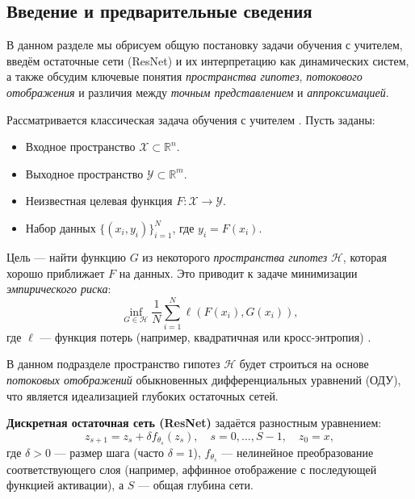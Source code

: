 \documentclass[../NDCNNAI_main.tex]{subfiles}
\begin{document}
\subsection{Введение и предварительные сведения}

В данном разделе мы обрисуем общую постановку задачи обучения с учителем, введём остаточные сети (ResNet) и их интерпретацию как динамических систем, а также обсудим ключевые понятия \emph{пространства гипотез}, \emph{потокового отображения} и различия между \emph{точным представлением} и \emph{аппроксимацией}.

Рассматривается классическая задача обучения с учителем \cite{Li2023DeepLD}. Пусть заданы:
\begin{itemize}
    \item Входное пространство $\mathcal{X} \subset \mathbb{R}^n$.
    \item Выходное пространство $\mathcal{Y} \subset \mathbb{R}^m$.
    \item Неизвестная целевая функция $F: \mathcal{X} \to \mathcal{Y}$.
    \item Набор данных $\{(x_i, y_i)\}_{i=1}^{N}$, где $y_i = F(x_i)$.
\end{itemize}
Цель --- найти функцию $G$ из некоторого \emph{пространства гипотез} $\mathcal{H}$, которая хорошо приближает $F$ на данных. Это приводит к задаче минимизации \emph{эмпирического риска}:
\begin{equation*}
\inf_{G \in \mathcal{H}} \frac{1}{N} \sum_{i=1}^{N} \ell(F(x_i), G(x_i)),
\end{equation*}
где $\ell$ --- функция потерь (например, квадратичная или кросс-энтропия) \cite[Раздел 1.1]{Li2023DeepLD}.

В данном подразделе пространство гипотез $\mathcal{H}$ будет строиться на основе \emph{потоковых отображений} обыкновенных дифференциальных уравнений (ОДУ), что является идеализацией глубоких остаточных сетей.

\textbf{Дискретная остаточная сеть (ResNet)} \cite[Раздел 1.2]{Li2023DeepLD} задаётся разностным уравнением:
\begin{equation}
\label{eq:resnet_discrete}
z_{s+1} = z_s + \delta f_{\theta_s}(z_s), \quad s = 0, \ldots, S-1, \quad z_0 = x,
\end{equation}
где $\delta > 0$ --- размер шага (часто $\delta=1$), $f_{\theta_s}$ --- нелинейное преобразование соответствующего слоя (например, аффинное отображение с последующей функцией активации), а $S$ --- общая глубина сети.
\end{document}
